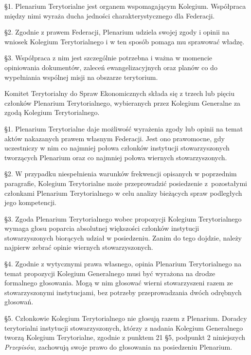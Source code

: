 
 \S{}1. Plenarium Terytorialne jest organem wspomagającym Kolegium. Współpraca między nimi wyraża ducha jedności charakterystycznego dla Federacji.

\S{}2. Zgodnie z prawem Federacji, Plenarium udziela swojej zgody i opinii na wniosek Kolegium Terytorialnego i w ten sposób pomaga mu sprawować władzę.

\S{}3. Współpraca z nim jest szczególnie potrzebna i ważna w momencie opiniowania dokumentów, zaleceń ewangelizacyjnych oraz planów co do wypełniania wspólnej misji na obszarze terytorium.


 Komitet Terytorialny do Spraw Ekonomicznych składa się z trzech lub pięciu członków Plenarium Terytorialnego, wybieranych przez Kolegium Generalne za zgodą Kolegium Terytorialnego.


 \S{}1. Plenarium Terytorialne daje możliwość wyrażenia zgody lub opinii na temat aktów nakazanych prawem własnym Federacji. Jest ono prawomocne, gdy uczestniczy w nim co najmniej połowa członków instytucji stowarzyszonych tworzących Plenarium oraz co najmniej połowa wiernych stowarzyszonych.

\S{}2. W przypadku niespełnienia warunków frekwencji opisanych w poprzednim paragrafie, Kolegium Terytorialne może przeprowadzić posiedzenie \mbox{z pozostałymi} członkami Plenarium Terytorialnego w celu analizy bieżących spraw podległych jego kompetencji.

\S{}3. Zgoda Plenarium Terytorialnego wobec propozycji Kolegium Terytorialnego wymaga głosu poparcia absolutnej większości członków instytucji stowarzyszonych biorących udział w posiedzeniu. Zanim do tego dojdzie, należy najpierw zebrać opinie wiernych stowarzyszonych.

\S{}4. Zgodnie z wytycznymi prawa własnego, opinia Plenarium Terytorialnego na temat propozycji Kolegium Generalnego musi być wyrażona na drodze formalnego głosowania. Mogą w nim głosować wierni stowarzyszeni razem ze stowarzyszonymi instytucjami, bez potrzeby przeprowadzania dwóch odrębnych głosowań. 

\S{}5. Członkowie Kolegium Terytorialnego nie głosują razem z Plenarium. Doradcy terytorialni instytucji stowarzyszonych, którzy z nadania Kolegium Generalnego tworzą Kolegium Terytorialne, zgodnie z punktem 21 \S{}5, podpunkt 2 niniejszych {\em Przepisów}, zachowują swoje prawo do głosowania na posiedzeniu Plenarium.

